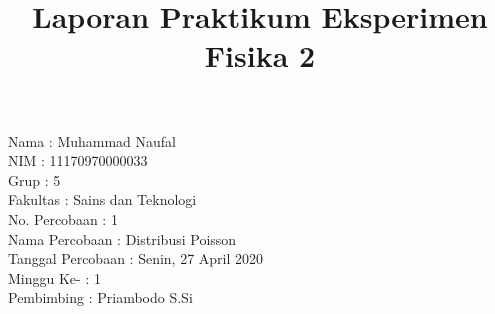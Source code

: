 \documentclass{article}
\title{Laporan Praktikum Eksperimen Fisika 2}
\author{  }
\date{  }
\begin{document}
	\begin{titlepage}
		\huge\maketitle 
		\thispagestyle{empty} 
		\noindent \huge{Nama\hspace{3.91cm} : Muhammad Naufal}\\
		\huge{NIM\hspace{4.3cm} : 11170970000033}\\
		\huge{Grup\hspace{4.13cm} : 5}\\
		\huge{Fakultas\hspace{3.2cm} : Sains dan Teknologi}\\
		\huge{No. Percobaan\hspace{1.28cm} : 1}\\
		\huge{Nama Percobaan \hspace{0.4cm} : Distribusi Poisson}\\
		\huge{Tanggal Percobaan : Senin, 27 April 2020}\\
		\huge{Minggu Ke- \hspace{1.9cm} : 1}\\
		\huge{Pembimbing \hspace{1.75cm} : Priambodo S.Si}
	\end{titlepage}
\end{document}
